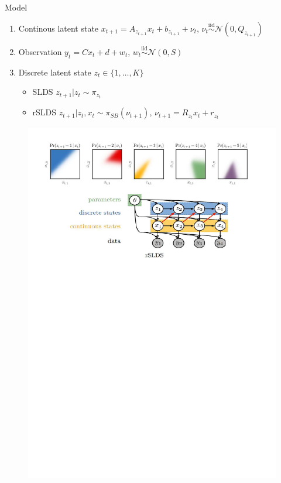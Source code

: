 \documentclass{beamer}
\begin{document}
\begin{frame}{Model}%

\begin{tcolorbox}[colback=blue!10!white,colframe=blue!50!black,title=SLDS and rSLDS,boxrule=2pt, boxsep=0.1em, left=0.1em, right=0.1em,
fontupper=\fontsize{8}{10}\selectfont] %
\begin{enumerate}[\textbullet]
\item Continous latent state $x_{t+1}=A_{z_{t+1}}x_t+b_{z_{t+1}}+\nu_t \text{, } \nu_t \overset{\mathrm{iid}}{\sim} \mathcal{N}(0,Q_{z_{t+1}})$
\item Observation $y_t=C x_t+d+w_t\text{, }w_t \overset{\mathrm{iid}}{\sim} \mathcal{N}(0,S)$
    \item Discrete latent state $z_t \in \{1,\dots,K\}$
        \begin{itemize}
            \item SLDS {\cite{Ackerson&Fu}}
$z_{t+1} | z_t \sim \pi_{z_t}$
            \item rSLDS {\cite{Barber}}
 $z_{t+1} | z_t, x_t \sim \pi_{SB}(\nu_{t+1})$, $\nu_{t+1}=R_{z_t}x_t+r_{z_t}$
        \end{itemize}
\end{enumerate}
\end{tcolorbox}

\begin{figure}
    \centering
    \includegraphics[width=0.8\linewidth]{gallery/model_p1.pdf}
    \caption{}
  \end{figure}




\end{frame}
\end{document}
